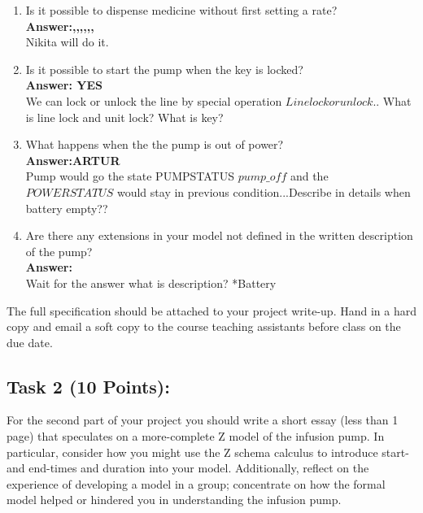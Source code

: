 \documentclass{article}
\newcommand{\head}{\subsection*}
\begin{document}
\begin{enumerate}
    \item Is it possible to dispense medicine without first
    setting a rate?
    \\
    \textbf{Answer:,,,,,,}\\
    Nikita will do it.
    \item Is it possible to start the pump when the key is locked?
    \\
    \textbf{Answer: YES}\\
    We can lock or unlock the line by special operation $Linelockorunlock$.. What is line lock and unit lock? What is key? 
    \item What happens when the the pump is out of power?
    \\
    \textbf{Answer:ARTUR}\\
    Pump would go the state PUMPSTATUS $pump\_off$ and the $POWERSTATUS$ would stay in previous condition...Describe in details when battery empty?? 
    \item Are there any extensions in your model not defined in
    the written description of the pump?
    \\
    \textbf{Answer:}\\
    Wait for the answer what is description? *Battery
\end{enumerate}

\noindent The full specification should be attached to your project
write-up. Hand in a hard copy and email a soft copy to the course
teaching assistants before class on the due date.

\head{Task 2 (10 Points):}

For the second part of your project you should write a short essay
(less than 1 page) that speculates on a more-complete Z model of the infusion pump. In particular, consider how you might use the Z schema calculus to introduce start- and end-times and duration into your model.
Additionally, reflect on the experience of developing a model in a
group; concentrate on how the formal model helped or hindered you in
understanding the infusion pump.
\end{document}
